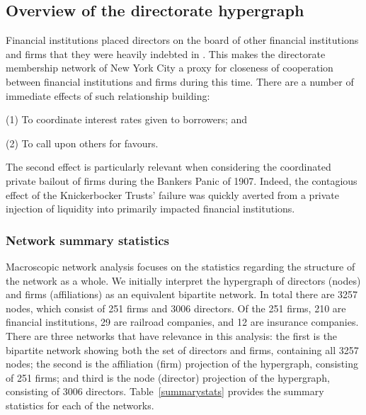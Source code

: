 \subsection{Overview of the directorate hypergraph}

Financial institutions placed directors on the board of other financial institutions and firms that they were heavily indebted in \citep{PujoCommittee1913}. This makes the directorate membership network of New York City a proxy for closeness of cooperation between financial institutions and firms during this time. There are a number of immediate effects of such relationship building:
\begin{abet}
\item[(1)] To coordinate interest rates given to borrowers; and
\item[(2)] To call upon others for favours.
\end{abet}
The second effect is particularly relevant when considering the coordinated private bailout of firms during the Bankers Panic of 1907. Indeed, the contagious effect of the Knickerbocker Trusts' failure was quickly averted from a private injection of liquidity into primarily impacted financial institutions.

\subsubsection*{Network summary statistics}

Macroscopic network analysis focuses on the statistics regarding the structure of the network as a whole. We initially interpret the hypergraph of directors (nodes) and firms (affiliations) as an equivalent bipartite network. In total there are 3257 nodes, which consist of 251 firms and 3006 directors. Of the 251 firms, 210 are financial institutions, 29 are railroad companies, and 12 are insurance companies. There are three networks that have relevance in this analysis: the first is the bipartite network showing both the set of directors and firms, containing all 3257 nodes; the second is the affiliation (firm) projection of the hypergraph, consisting of 251 firms; and third is the node (director) projection of the hypergraph, consisting of 3006 directors. Table~\ref{summarystats} provides the summary statistics for each of the networks.

